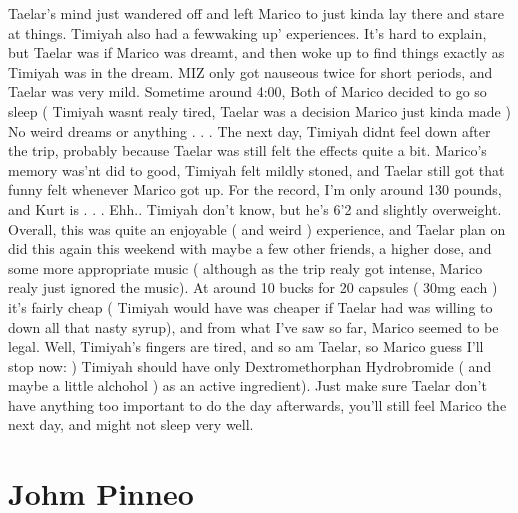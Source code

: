 \documentclass[12pt]{book}
\begin{document}
Taelar's mind just wandered off and left Marico to just kinda lay there and stare at things. Timiyah also had a fewwaking up' experiences. It's hard to explain, but Taelar was if Marico was dreamt, and then woke up to find things exactly as Timiyah was in the dream. MIZ only got nauseous twice for short periods, and Taelar was very mild. Sometime around 4:00, Both of Marico decided to go so sleep ( Timiyah wasnt realy tired, Taelar was a decision Marico just kinda made ) No weird dreams or anything . . .  The next day, Timiyah didnt feel down after the trip, probably because Taelar was still felt the effects quite a bit. Marico's memory was'nt did to good, Timiyah felt mildly stoned, and Taelar still got that funny felt whenever Marico got up. For the record, I'm only around 130 pounds, and Kurt is . . .  Ehh.. Timiyah don't know, but he's 6'2 and slightly overweight. Overall, this was quite an enjoyable ( and weird ) experience, and Taelar plan on did this again this weekend with maybe a few other friends, a higher dose, and some more appropriate music ( although as the trip realy got intense, Marico realy just ignored the music). At around 10 bucks for 20 capsules ( 30mg each ) it's fairly cheap ( Timiyah would have was cheaper if Taelar had was willing to down all that nasty syrup), and from what I've saw so far, Marico seemed to be legal. Well, Timiyah's fingers are tired, and so am Taelar, so Marico guess I'll stop now: ) Timiyah should have only Dextromethorphan Hydrobromide ( and maybe a little alchohol ) as an active ingredient). Just make sure Taelar don't have anything too important to do the day afterwards, you'll still feel Marico the next day, and might not sleep very well.



\chapter{Johm Pinneo}
\end{document}
